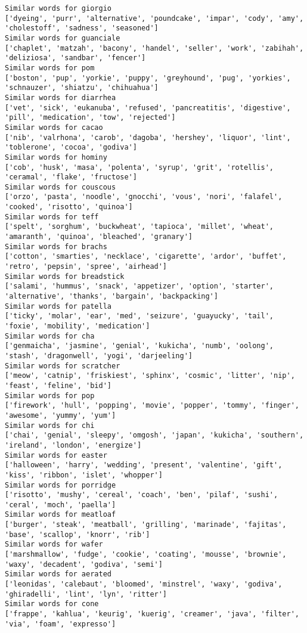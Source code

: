 \documentclass[11pt]{article}
\begin{document}
\begin{Verbatim}[commandchars=\\\{\}]
Similar words for giorgio
['dyeing', 'purr', 'alternative', 'poundcake', 'impar', 'cody', 'amy', 'cholestoff', 'sadness', 'seasoned']
Similar words for guanciale
['chaplet', 'matzah', 'bacony', 'handel', 'seller', 'work', 'zabihah', 'deliziosa', 'sandbar', 'fencer']
Similar words for pom
['boston', 'pup', 'yorkie', 'puppy', 'greyhound', 'pug', 'yorkies', 'schnauzer', 'shiatzu', 'chihuahua']
Similar words for diarrhea
['vet', 'sick', 'eukanuba', 'refused', 'pancreatitis', 'digestive', 'pill', 'medication', 'tow', 'rejected']
Similar words for cacao
['nib', 'valrhona', 'carob', 'dagoba', 'hershey', 'liquor', 'lint', 'toblerone', 'cocoa', 'godiva']
Similar words for hominy
['cob', 'husk', 'masa', 'polenta', 'syrup', 'grit', 'rotellis', 'ceramal', 'flake', 'fructose']
Similar words for couscous
['orzo', 'pasta', 'noodle', 'gnocchi', 'vous', 'nori', 'falafel', 'cooked', 'risotto', 'quinoa']
Similar words for teff
['spelt', 'sorghum', 'buckwheat', 'tapioca', 'millet', 'wheat', 'amaranth', 'quinoa', 'bleached', 'granary']
Similar words for brachs
['cotton', 'smarties', 'necklace', 'cigarette', 'ardor', 'buffet', 'retro', 'pepsin', 'spree', 'airhead']
Similar words for breadstick
['salami', 'hummus', 'snack', 'appetizer', 'option', 'starter', 'alternative', 'thanks', 'bargain', 'backpacking']
Similar words for patella
['ticky', 'molar', 'ear', 'med', 'seizure', 'guayucky', 'tail', 'foxie', 'mobility', 'medication']
Similar words for cha
['genmaicha', 'jasmine', 'genial', 'kukicha', 'numb', 'oolong', 'stash', 'dragonwell', 'yogi', 'darjeeling']
Similar words for scratcher
['meow', 'catnip', 'friskiest', 'sphinx', 'cosmic', 'litter', 'nip', 'feast', 'feline', 'bid']
Similar words for pop
['firework', 'hull', 'popping', 'movie', 'popper', 'tommy', 'finger', 'awesome', 'yummy', 'yum']
Similar words for chi
['chai', 'genial', 'sleepy', 'omgosh', 'japan', 'kukicha', 'southern', 'ireland', 'london', 'energize']
Similar words for easter
['halloween', 'harry', 'wedding', 'present', 'valentine', 'gift', 'kiss', 'ribbon', 'islet', 'whopper']
Similar words for porridge
['risotto', 'mushy', 'cereal', 'coach', 'ben', 'pilaf', 'sushi', 'ceral', 'moch', 'paella']
Similar words for meatloaf
['burger', 'steak', 'meatball', 'grilling', 'marinade', 'fajitas', 'base', 'scallop', 'knorr', 'rib']
Similar words for wafer
['marshmallow', 'fudge', 'cookie', 'coating', 'mousse', 'brownie', 'waxy', 'decadent', 'godiva', 'semi']
Similar words for aerated
['leonidas', 'calebaut', 'bloomed', 'minstrel', 'waxy', 'godiva', 'ghiradelli', 'lint', 'lyn', 'ritter']
Similar words for cone
['frappe', 'kahlua', 'keurig', 'kuerig', 'creamer', 'java', 'filter', 'via', 'foam', 'expresso']

\end{Verbatim}
\end{document}
